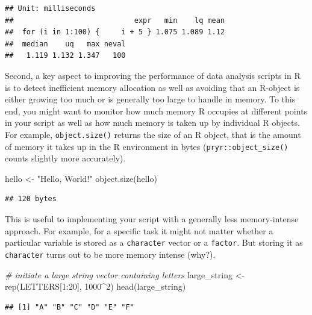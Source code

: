 \documentclass[
  12pt,
]{style/krantz}
\newenvironment{Shaded}{\begin{snugshade}}{\end{snugshade}}
\newcommand{\CommentTok}[1]{\textcolor[rgb]{0.56,0.35,0.01}{\textit{#1}}}
\newcommand{\DecValTok}[1]{\textcolor[rgb]{0.00,0.00,0.81}{#1}}
\newcommand{\FunctionTok}[1]{\textcolor[rgb]{0.00,0.00,0.00}{#1}}
\newcommand{\NormalTok}[1]{#1}
\newcommand{\OtherTok}[1]{\textcolor[rgb]{0.56,0.35,0.01}{#1}}
\newcommand{\SpecialCharTok}[1]{\textcolor[rgb]{0.00,0.00,0.00}{#1}}
\newcommand{\StringTok}[1]{\textcolor[rgb]{0.31,0.60,0.02}{#1}}
\begin{document}
\begin{verbatim}
## Unit: milliseconds
##                            expr   min    lq mean
##  for (i in 1:100) {     i + 5 } 1.075 1.089 1.12
##  median    uq   max neval
##   1.119 1.132 1.347   100
\end{verbatim}

Second, a key aspect to improving the performance of data analysis scripts in R is to detect inefficient memory allocation as well as avoiding that an R-object is either growing too much or is generally too large to handle in memory. To this end, you might want to monitor how much memory R occupies at different points in your script as well as how much memory is taken up by individual R objects. For example, \texttt{object.size()} returns the size of an R object, that is the amount of memory it takes up in the R environment in bytes (\texttt{pryr::object\_size()} counts slightly more accurately).

\begin{Shaded}
\begin{Highlighting}[]
\NormalTok{hello }\OtherTok{\textless{}{-}} \StringTok{"Hello, World!"}
\FunctionTok{object.size}\NormalTok{(hello)}
\end{Highlighting}
\end{Shaded}

\begin{verbatim}
## 120 bytes
\end{verbatim}

This is useful to implementing your script with a generally less memory-intense approach. For example, for a specific task it might not matter whether a particular variable is stored as a \texttt{character} vector or a \texttt{factor}. But storing it as \texttt{character} turns out to be more memory intense (why?).

\begin{Shaded}
\begin{Highlighting}[]
\CommentTok{\# initiate a large string vector containing letters}
\NormalTok{large\_string }\OtherTok{\textless{}{-}} \FunctionTok{rep}\NormalTok{(LETTERS[}\DecValTok{1}\SpecialCharTok{:}\DecValTok{20}\NormalTok{], }\DecValTok{1000}\SpecialCharTok{\^{}}\DecValTok{2}\NormalTok{)}
\FunctionTok{head}\NormalTok{(large\_string)}
\end{Highlighting}
\end{Shaded}

\begin{verbatim}
## [1] "A" "B" "C" "D" "E" "F"
\end{verbatim}
\end{document}
